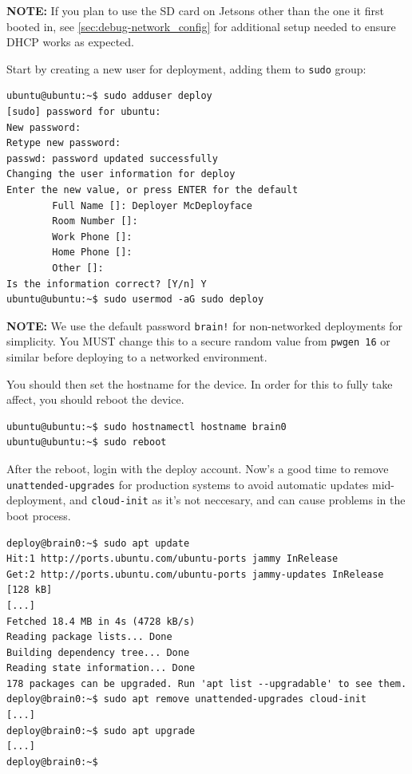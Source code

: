\documentclass[11pt]{article}
\begin{document}
\textbf{NOTE:} If you plan to use the SD card on Jetsons other than the one it first booted in, see \autoref{sec:debug-network_config} for additional setup needed to ensure DHCP works as expected.

Start by creating a new user for deployment, adding them to \texttt{sudo} group:

\lstset{style=console}
\begin{lstlisting}
ubuntu@ubuntu:~$ sudo adduser deploy
[sudo] password for ubuntu:
New password:
Retype new password:
passwd: password updated successfully
Changing the user information for deploy
Enter the new value, or press ENTER for the default
        Full Name []: Deployer McDeployface
        Room Number []:
        Work Phone []:
        Home Phone []:
        Other []:
Is the information correct? [Y/n] Y
ubuntu@ubuntu:~$ sudo usermod -aG sudo deploy
\end{lstlisting}

\textbf{NOTE:} We use the default password \texttt{brain!} for non-networked deployments for simplicity. You MUST change this to a secure random value from \texttt{pwgen 16} or similar before deploying to a networked environment.

You should then set the hostname for the device. In order for this to fully take affect, you should reboot the device.

\begin{lstlisting}
ubuntu@ubuntu:~$ sudo hostnamectl hostname brain0
ubuntu@ubuntu:~$ sudo reboot
\end{lstlisting}

After the reboot, login with the deploy account. Now's a good time to remove \texttt{unattended-upgrades} for production systems to avoid automatic updates mid-deployment, and \texttt{cloud-init} as it's not neccesary, and can cause problems in the boot process.

\lstset{style=console}
\begin{lstlisting}
deploy@brain0:~$ sudo apt update
Hit:1 http://ports.ubuntu.com/ubuntu-ports jammy InRelease
Get:2 http://ports.ubuntu.com/ubuntu-ports jammy-updates InRelease [128 kB]
[...]
Fetched 18.4 MB in 4s (4728 kB/s)
Reading package lists... Done
Building dependency tree... Done
Reading state information... Done
178 packages can be upgraded. Run 'apt list --upgradable' to see them.
deploy@brain0:~$ sudo apt remove unattended-upgrades cloud-init
[...]
deploy@brain0:~$ sudo apt upgrade
[...]
deploy@brain0:~$
\end{lstlisting}
\end{document}
